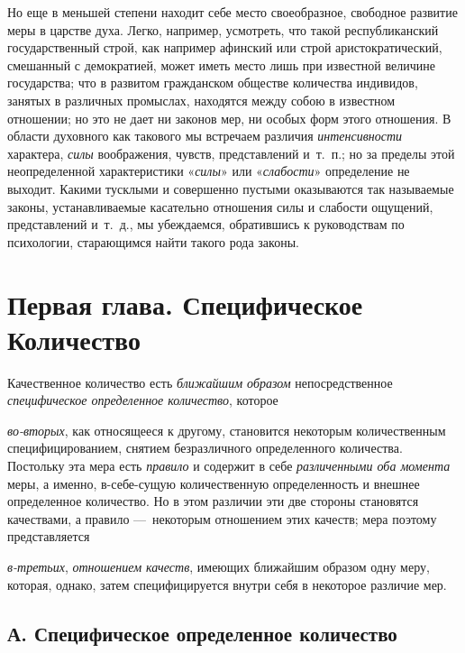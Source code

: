 Но еще в меньшей степени находит себе место своеобразное, свободное развитие
меры в царстве духа. Легко, например, усмотреть, что такой республиканский
государственный строй, как например афинский или строй аристократический,
смешанный с демократией, может иметь место лишь при известной величине
государства; что в развитом гражданском обществе количества индивидов,
занятых в различных промыслах, находятся между собою в известном отношении;
но это не дает ни законов мер, ни особых форм этого отношения. В области
духовного как такового мы встречаем различия
{\em интенсивности} характера,
{\em силы} воображения, чувств, представлений и~т.~п.;
но за пределы этой неопределенной характеристики
«{\em силы}» или «{\em слабости}»
определение не выходит. Какими тусклыми и совершенно пустыми оказываются
так называемые законы, устанавливаемые касательно отношения силы и слабости
ощущений, представлений и~т.~д., мы убеждаемся, обратившись к руководствам
по психологии, старающимся найти такого рода законы.

\chapter[{\em Первая глава} Специфическое Количество]{Первая глава. Специфическое Количество}
Качественное количество есть
{\em ближайшим образом} непосредственное
{\em специфическое определенное количество}, которое

{\em во-вторых}, как относящееся к другому, становится
некоторым количественным специфицированием, снятием безразличного
определенного количества. Постольку эта мера есть
{\em правило} и содержит в себе
{\em различенными оба момента} меры, а именно,
в-себе-сущую количественную определенность и внешнее определенное
количество. Но в этом различии эти две стороны становятся качествами, а
правило —~некоторым отношением этих качеств; мера поэтому представляется

{\em в-третьих}, {\em отношением
качеств}, имеющих ближайшим образом одну меру, которая, однако, затем
специфицируется внутри себя в некоторое различие мер.


\section[А. Специфическое определенное количество]{А. Специфическое
определенное количество}

